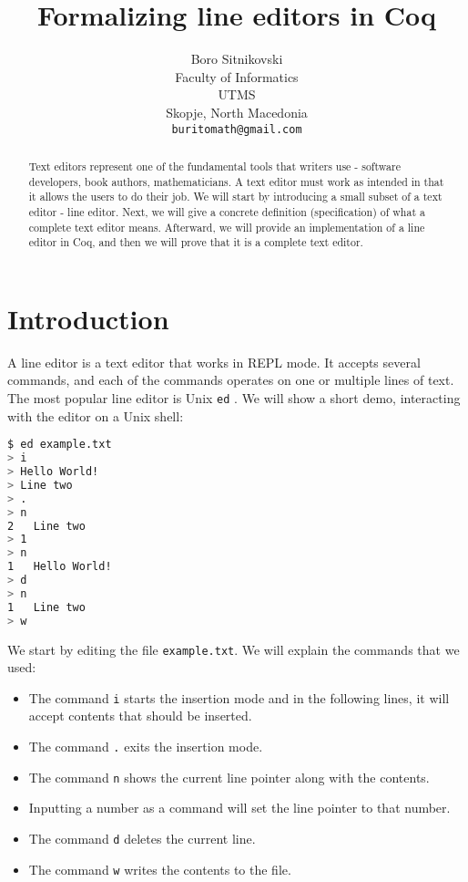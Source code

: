\documentclass{article}
\title{Formalizing line editors in Coq}
\author{
  Boro Sitnikovski \\
  Faculty of Informatics\\
  UTMS\\
  Skopje, North Macedonia \\
  \texttt{buritomath@gmail.com} \\
}
\theoremstyle{definition}
\begin{document}
\maketitle

\begin{abstract}
Text editors represent one of the fundamental tools that writers use - software developers, book authors, mathematicians. A text editor must work as intended in that it allows the users to do their job. We will start by introducing a small subset of a text editor - line editor. Next, we will give a concrete definition (specification) of what a complete text editor means. Afterward, we will provide an implementation of a line editor in Coq, and then we will prove that it is a complete text editor.
\end{abstract}


\section{Introduction}

A line editor is a text editor that works in REPL mode. It accepts several commands, and each of the commands operates on one or multiple lines of text. The most popular line editor is Unix \texttt{ed} \cite{b1}. We will show a short demo, interacting with the editor on a Unix shell:

\begin{lstlisting}[language=sh]
$ ed example.txt
> i
> Hello World!
> Line two
> .
> n
2	Line two
> 1
> n
1	Hello World!
> d
> n
1	Line two
> w
\end{lstlisting}

We start by editing the file \texttt{example.txt}. We will explain the commands that we used:

\begin{itemize}
\item The command \texttt{i} starts the insertion mode and in the following lines, it will accept contents that should be inserted.
\item The command \texttt{.} exits the insertion mode.
\item The command \texttt{n} shows the current line pointer along with the contents.
\item Inputting a number as a command will set the line pointer to that number.
\item The command \texttt{d} deletes the current line.
\item The command \texttt{w} writes the contents to the file.
\end{itemize}
\end{document}
